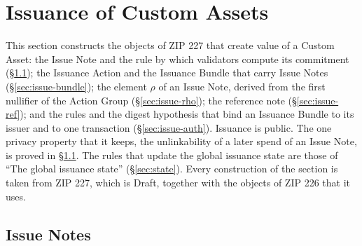 \documentclass[11pt,a4paper]{article}
\theoremstyle{definition}
\begin{document}
\section{Issuance of Custom Assets}\label{sec:issue}

This section constructs the objects of ZIP 227 that create value of a
Custom Asset: the Issue Note and the rule by which validators compute its
commitment (\S\ref{sec:issue-note}); the Issuance Action and the Issuance
Bundle that carry Issue Notes (\S\ref{sec:issue-bundle}); the element $\rho$
of an Issue Note, derived from the first nullifier of the Action Group
(\S\ref{sec:issue-rho}); the reference note (\S\ref{sec:issue-ref}); and the
rules and the digest hypothesis that bind an Issuance Bundle to its issuer
and to one transaction (\S\ref{sec:issue-auth}). Issuance is public. The one
privacy property that it keeps, the unlinkability of a later spend of an
Issue Note, is proved in \S\ref{sec:issue-note}. The rules that update the
global issuance state are those of ``The global issuance state''
(\S\ref{sec:state}). Every construction of the section is taken from ZIP
227, which is Draft, together with the objects of ZIP 226 that it uses.

\subsection{Issue Notes}\label{sec:issue-note}
\end{document}
